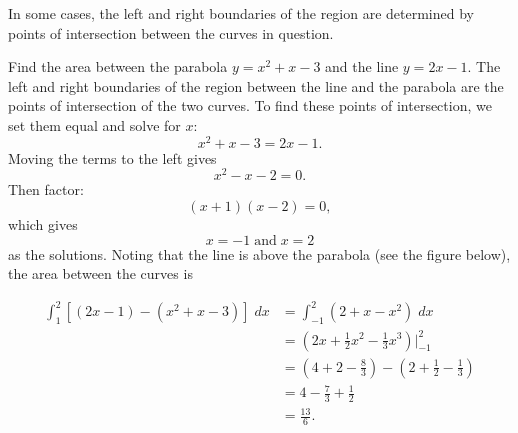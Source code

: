 \documentclass{ximera}
\begin{document}
In some cases, the left and right boundaries of the region are determined by points of intersection between the curves in question.

\begin{example}
Find the area between the parabola $y = x^2 + x - 3$ and the line $y = 2x - 1$. The left and right boundaries of the region between the line and the parabola are 
the points of intersection of the two curves. To find these points of intersection, we set them equal and solve for $x$:
\[
x^2 + x - 3 = 2x-1.
\]
Moving the terms to the left gives
\[
 x^2 -x -2 = 0.
 \]
 Then factor:
 \[
  (x+1)(x-2) = 0,
  \]
  which gives
  \[
   x = -1 \;\text{and}\; x= 2
   \]
   as the solutions.
Noting that the line is above the parabola (see the figure below), the area between the curves is 

\begin{align*}
\int_1^2 \left[(2x - 1) - (x^2 + x - 3)\right] \; dx &= \int_{-1}^2 \left(2 + x - x^2\right) \; dx \\
                                           &= \left(2x + \frac12 x^2 - \frac13 x^3 \right) \bigg|_{-1}^2 \\
                                           &= \left(4 + 2 - \frac83 \right) - \left(2 + \frac12 - \frac13 \right)\\
                                           &= 4 - \frac73 + \frac12 \\
                                           & = \frac{13}{6}.
\end{align*}

\begin{center}
\end{center}
\end{example}
\end{document}
